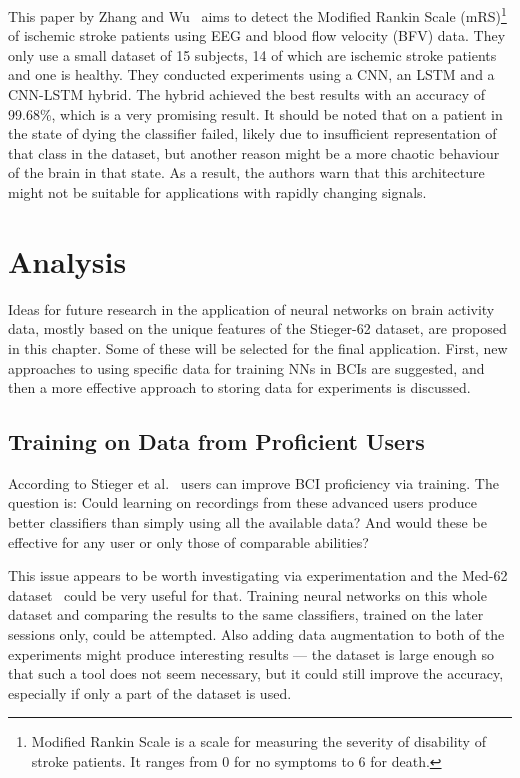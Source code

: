 \documentclass[english, he, bc, kiv, iso690alph, viewonly]{fasthesis}
\begin{document}
This paper by Zhang and Wu~\cite{zhang:similar:20} aims to detect the Modified Rankin Scale (mRS)\footnote{Modified Rankin Scale is a scale for measuring the severity of disability of stroke patients. It ranges from 0 for no symptoms to 6 for death.} of ischemic stroke patients using EEG and blood flow velocity (BFV) data. They only use a small dataset of 15 subjects, 14 of which are ischemic stroke patients and one is healthy. They conducted experiments using a CNN, an LSTM and a CNN-LSTM hybrid. The hybrid achieved the best results with an accuracy of 99.68\%, which is a very promising result. It should be noted that on a patient in the state of dying the classifier failed, likely due to insufficient representation of that class in the dataset, but another reason might be a more chaotic behaviour of the brain in that state. As a result, the authors warn that this architecture might not be suitable for applications with rapidly changing signals.

\chapter{Analysis}

Ideas for future research in the application of neural networks on brain activity data, mostly based on the unique features of the Stieger-62 dataset, are proposed in this chapter. Some of these will be selected for the final application. First, new approaches to using specific data for training NNs in BCIs are suggested, and then a more effective approach to storing data for experiments is discussed.

\section{Training on Data from Proficient Users}

According to Stieger et al.~\cite{data:stieger:21,stieger:mindfulness:20} users can improve BCI proficiency via training. The question is: Could learning on recordings from these advanced users produce better classifiers than simply using all the available data? And would these be effective for any user or only those of comparable abilities?

This issue appears to be worth investigating via experimentation and the Med-62 dataset~\cite{data:stieger:21} could be very useful for that. Training neural networks on this whole dataset and comparing the results to the same classifiers, trained on the later sessions only, could be attempted. Also adding data augmentation to both of the experiments might produce interesting results --- the dataset is large enough so that such a tool does not seem necessary, but it could still improve the accuracy, especially if only a part of the dataset is used.
\end{document}

